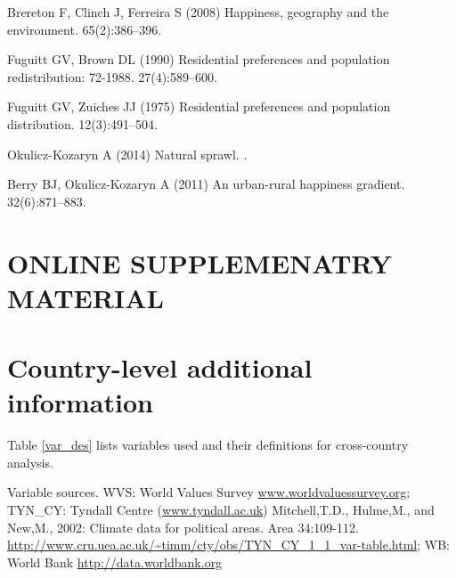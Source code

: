 \documentclass[10pt, letterpaper]{article}
\begin{document}
\begin{spacing}{1.4}
\begin{thebibliography}{10}
Brereton F, Clinch J, Ferreira S (2008) Happiness, geography and the
  environment.
 65(2):386--396.

Fuguitt GV, Brown DL (1990) Residential preferences and population
  redistribution: 72-1988.
 27(4):589--600.

Fuguitt GV, Zuiches JJ (1975) Residential preferences and population
  distribution.
 12(3):491--504.

Okulicz-Kozaryn A (2014) Natural sprawl.
.

Berry BJ, Okulicz-Kozaryn A (2011) An urban-rural happiness gradient.
 32(6):871--883.

\end{thebibliography}




\newpage
\section{\huge ONLINE SUPPLEMENATRY MATERIAL}

\tableofcontents

\section{Country-level additional information}

Table
\ref{var_des} lists variables used and their definitions for cross-country
analysis. 



{\scriptsize \noindent Variable sources. WVS: World Values Survey \url{www.worldvaluessurvey.org};
TYN\_CY: Tyndall Centre (\url{www.tyndall.ac.uk}) Mitchell,T.D., Hulme,M., and
New,M., 2002: Climate data for political areas. Area
34:109-112. \url{http://www.cru.uea.ac.uk/~timm/cty/obs/TYN_CY_1_1_var-table.html};
WB: World Bank \url{http://data.worldbank.org}}




\end{spacing}
\end{document}

